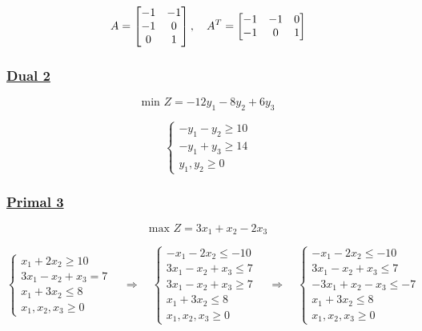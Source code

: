 \vspace{0.5cm}

\[
A = \left[\begin{matrix}   -1 & -1  \\
                           -1 & 0 \\
                           0 & 1 
                           \end{matrix}\right], \hspace{0.35cm}
        A^{T} = \left[\begin{matrix}  -1 & -1 & 0  \\
                                      -1 & 0 & 1\\
                     \end{matrix}\right]
\]

\newpage
\subsubsection*{\underline{Dual 2}}
\[\text{min } Z = -12y_1 -8 y_2 + 6y_3\]

\[
\left\{
\begin{array}{l}
    -y_{1} -y_{2}  \geq 10 \\
    -y_{1}  + y_{3} \geq 14 \\
    y_{1}, y_{2}\geq 0
\end{array}
\right.
\]

\vspace{1cm}
\subsubsection*{\underline{Primal 3}}

\vspace{0.25cm}
\[\text{max } Z = 3x_1 + x_2 - 2x_3\]

\[
\left\{
\begin{array}{l}
        x_{1} + 2x_{2} \geq 10 \\[2pt]
        3x_{1} - x_{2} + x_{3} =  7 \\[2pt]
        x_{1} + 3x_{2} \leq 8 \\[2pt]
        x_{1}, x_{2}, x_{3}\geq 0
\end{array}
\right.
\quad\Longrightarrow\quad
\left\{
\begin{array}{l}
        -x_{1} - 2x_{2} \leq -10 \\[2pt]
        3x_{1} - x_{2} + x_{3} \leq  7 \\[2pt]
        3x_{1} - x_{2} + x_{3} \geq  7 \\[2pt]
        x_{1} + 3x_{2} \leq 8 \\[2pt]
        x_{1}, x_{2}, x_{3}\geq 0
\end{array}
\right.
\quad\Longrightarrow\quad
\left\{
\begin{array}{l}
        -x_{1} - 2x_{2} \leq -10 \\[2pt]
        3x_{1} - x_{2} + x_{3} \leq  7 \\[2pt]
        -3x_{1} + x_{2} - x_{3} \leq  -7 \\[2pt]
        x_{1} + 3x_{2} \leq 8 \\[2pt]
        x_{1}, x_{2}, x_{3}\geq 0
\end{array}
\right.
\]

